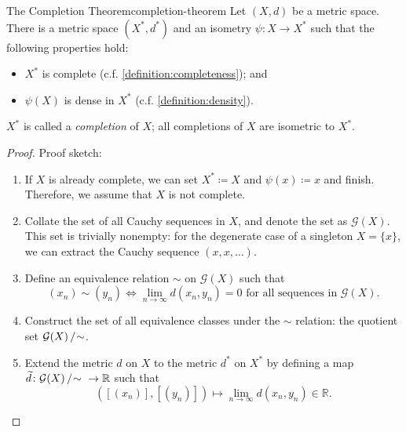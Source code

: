 \documentclass{article}
\newcommand*\cauchyquotient{%
    \ensuremath\mathcal{G}{\left(X\right)/\hspace{-.5ex}\sim}}
\numberwithin{equation}{section}
\numberwithin{figure}{section}
\begin{document}
\begin{theorem}{The Completion Theorem}{completion-theorem}
    Let $ (X, d) $ be a metric space. There is a metric space $ (X^*, d^*) $ and
    an isometry $ \psi \colon X \to X^* $ such that the following properties
    hold:
    \begin{itemize}
        \item $ X^* $ is complete (c.f. \cref{definition:completeness}); and
        \item $ \psi(X) $ is dense in $ X^* $ (c.f. \cref{definition:density}).
    \end{itemize}
    $ X^* $ is called a \emph{completion} of $ X $; all completions of $ X $ are
    isometric to $ X^* $.
    \begin{proof}
        Proof sketch:
        \begin{enumerate}
            \item If $ X $ is already complete, we can set $ X^* \coloneq X $
                and $ \psi(x) \coloneq x $ and finish. Therefore, we assume that
                $ X $ is not complete.
            \item Collate the set of all Cauchy sequences in $ X $, and denote
                the set as $ \mathcal{G}(X) $. This set is trivially nonempty:
                for the degenerate case of a singleton $ X = \{x\} $, we can
                extract the Cauchy sequence $ (x, x, \ldots) $.
            \item Define an equivalence relation $ \sim $ on $ \mathcal{G}(X) $
                such that
                \begin{equation}
                    \left( x_n \right) \sim \left( y_n \right) \iff
                    \lim_{n \to \infty}{d\left( x_n, y_n \right)} = 0
                    \text{ for all sequences in } \mathcal{G}(X).
                \end{equation}
            \item Construct the set of all equivalence classes under the $ \sim
                $ relation: the quotient set $ \cauchyquotient $.
            \item Extend the metric $ d $ on $ X $ to the metric $ d^* $ on $
                X^* $ by defining a map $ \widetilde{d} \colon \cauchyquotient~%
                \to \mathbb{R} $ such that
                \begin{equation}
                    \left(\left[\left( x_n \right)\right], \left[\left( y_n
                    \right)\right]\right) \mapsto \lim_{n \to
                    \infty}{d\left( x_n, y_n \right)} \in \mathbb{R}.

\end{equation}
\end{enumerate}
\end{proof}
\end{theorem}
\end{document}
